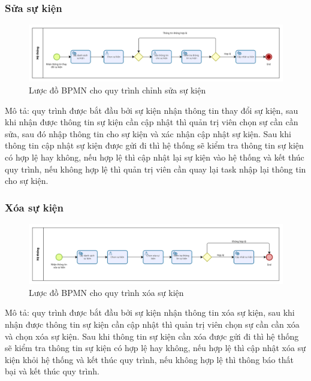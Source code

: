 \subsubsection{Sửa sự kiện}

\begin{figure}[!htp]
	\centering
	\includegraphics[width=14cm]{img/BPMN/event/edit_event.png}
	\newline
	\caption{Lược đồ BPMN cho quy trình chỉnh sửa sự kiện}
\end{figure}
Mô tả: quy trình được bắt đầu bởi sự kiện nhận thông tin thay đổi sự kiện, sau khi nhận được thông tin sự kiện cần cập nhật thì quản trị viên chọn sự cần cần sửa, sau đó nhập thông tin cho sự kiện và xác nhận cập nhật sự kiện. Sau khi thông tin cập nhật sự kiện được gửi đi thì hệ thống sẽ kiểm tra thông tin sự kiện có hợp lệ hay không, nếu hợp lệ thì cập nhật lại sự kiện vào hệ thống và kết thúc quy trình, nếu không hợp lệ thì quản trị viên cần quay lại task nhập lại thông tin cho sự kiện.

\subsubsection{Xóa sự kiện}

\begin{figure}[!htp]
	\centering
	\includegraphics[width=14cm]{img/BPMN/event/delete_event.png}
	\newline
	\caption{Lược đồ BPMN cho quy trình xóa sự kiện}
\end{figure}
Mô tả: quy trình được bắt đầu bởi sự kiện nhận thông tin xóa sự kiện, sau khi nhận được thông tin sự kiện cần cập nhật thì quản trị viên chọn sự cần cần xóa và chọn xóa sự kiện. Sau khi thông tin sự kiện cần xóa được gửi đi thì hệ thống sẽ kiểm tra thông tin sự kiện có hợp lệ hay không, nếu hợp lệ thì cập nhật xóa sự kiện khỏi hệ thống và kết thúc quy trình, nếu không hợp lệ thì thông báo thất bại và kết thúc quy trình.


